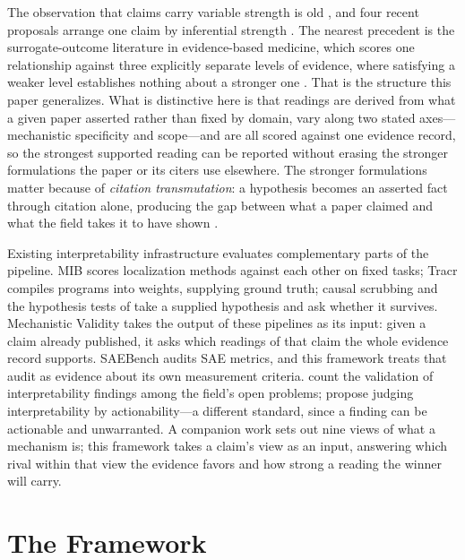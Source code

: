 \documentclass{article}
\begin{document}
The observation that claims carry variable strength is old \citep{toulmin1958uses}, and four recent proposals arrange one claim by inferential strength \citep{leavitt2020falsifiable, gupta2026anthropomorphic, salaudeen2025measurement, jacovi2020faithfully}. The nearest precedent is the surrogate-outcome literature in evidence-based medicine, which scores one relationship against three explicitly separate levels of evidence, where satisfying a weaker level establishes nothing about a stronger one \citep{euhta2024outcomes}. That is the structure this paper generalizes. What is distinctive here is that readings are derived from what a given paper asserted rather than fixed by domain, vary along two stated axes---mechanistic specificity and scope---and are all scored against one evidence record, so the strongest supported reading can be reported without erasing the stronger formulations the paper or its citers use elsewhere. The stronger formulations matter because of \emph{citation transmutation}: a hypothesis becomes an asserted fact through citation alone, producing the gap between what a paper claimed and what the field takes it to have shown \citep{greenberg2009citation}.

Existing interpretability infrastructure evaluates complementary parts of the pipeline. MIB \citep{mueller2025mib} scores localization methods against each other on fixed tasks; Tracr \citep{lindner2023interp} compiles programs into weights, supplying ground truth; causal scrubbing \citep{chan2022causal} and the hypothesis tests of \citet{shi2024hypothesis} take a supplied hypothesis and ask whether it survives. Mechanistic Validity takes the output of these pipelines as its input: given a claim already published, it asks which readings of that claim the whole evidence record supports. SAEBench \citep{karvonen2025saebench} audits SAE metrics, and this framework treats that audit as evidence about its own measurement criteria. \citet{sharkey2025open} count the validation of interpretability findings among the field's open problems; \citet{orgad2026actionable} propose judging interpretability by actionability---a different standard, since a finding can be actionable and unwarranted. A companion work \citep{tower2026mechviews} sets out nine views of what a mechanism is; this framework takes a claim's view as an input, answering which rival within that view the evidence favors and how strong a reading the winner will carry.

\section{The Framework}
\label{sec:framework}
\end{document}

